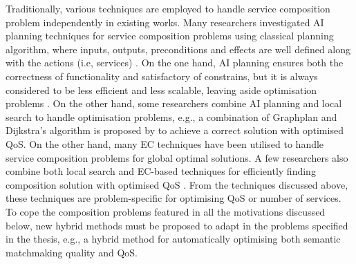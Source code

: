 Traditionally, various techniques are employed to handle service composition problem independently in existing works. Many researchers investigated AI planning techniques for service composition problems using classical planning algorithm, where inputs, outputs, preconditions and effects are well defined along with the actions (i.e, services) \cite{markou2015non,peer2005web}. On the one hand, AI planning ensures both the correctness of functionality and satisfactory of constrains, but it is always considered to be less efficient and less scalable, leaving aside optimisation problems \cite{parejo2008qos}. On the other hand, some researchers combine AI planning and local search to handle optimisation problems, e.g., a combination of Graphplan \cite{blum1997fast} and Dijkstra’s algorithm is proposed by \cite{feng2013dynamic} to achieve a correct solution with optimised QoS. On the other hand, many EC techniques have been utilised to handle service composition problems for global optimal solutions. A few researchers also combine both local search and EC-based techniques for efficiently finding composition solution with optimised QoS \cite{parejo2008qos}. From the techniques discussed above, these techniques are problem-specific for optimising QoS or number of services. To cope the composition problems featured in all the motivations discussed below, new hybrid methods must be proposed to adapt in the problems specified in the thesis, e.g., a hybrid method for automatically optimising both semantic matchmaking quality and QoS. 

